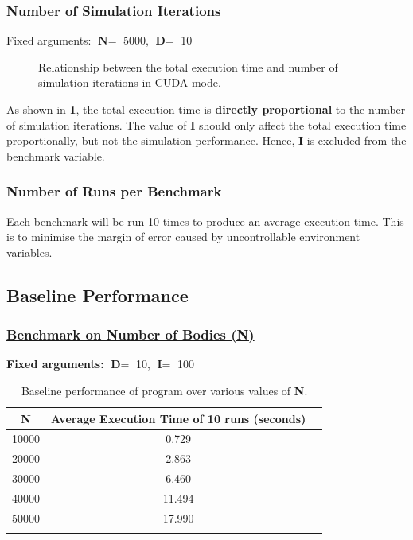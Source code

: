 \documentclass[12pt, a4paper]{article}
\let\oldcref\cref
\renewcommand{\cref}[1]{\textbf{\oldcref{#1}}}
\begin{document}
\subsubsection{Number of Simulation Iterations}
Fixed arguments: $\textbf{N} =$ 5000, $\textbf{D} =$ 10

\begin{figure}[ht]
  \centering
  \caption{Relationship between the total execution time and number of simulation iterations in CUDA mode.}
  \label{figure:simulation_iterations}
\end{figure}

As shown in \cref{figure:simulation_iterations}, the total execution time is \textbf{directly
proportional} to the number of simulation iterations. The value of \textbf{I} should only affect the
total execution time proportionally, but not the simulation performance. Hence, \textbf{I} is
excluded from the benchmark variable.

\subsubsection{Number of Runs per Benchmark}
Each benchmark will be run 10 times to produce an average execution time. This is to minimise the
margin of error caused by uncontrollable environment variables.

\subsection{Baseline Performance} \label{subsec:baseline_performance}
\subsubsection*{\underline{Benchmark on Number of Bodies (N)}}
\textbf{Fixed arguments:} $\textbf{D} =$ 10, $\textbf{I} =$ 100
\renewcommand{\arraystretch}{1.3}
\begin{longtable}{|c|c|c|}
  \hline \endfirsthead \rowcolor{lightgray}
  N     & Average Execution Time of 10 runs (seconds) \\ \hline
  10000 & 0.729                                       \\
  20000 & 2.863                                       \\
  30000 & 6.460                                       \\
  40000 & 11.494                                      \\
  50000 & 17.990                                      \\ \hline
  \caption{Baseline performance of program over various values of \textbf{N}.}
  \label{table:baseline_n}
\end{longtable}
\renewcommand{\arraystretch}{1}
\end{document}
